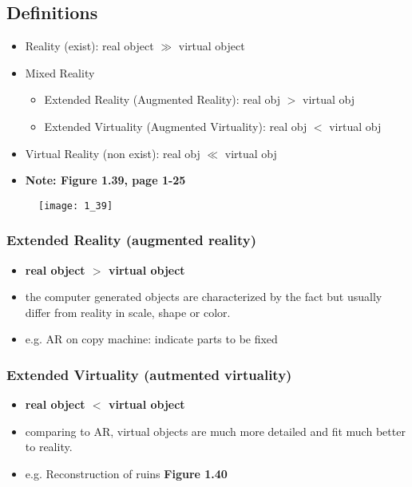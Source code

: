 \documentclass{standalone}
\begin{document}
\subsection{Definitions}

\begin{itemize}
	\item Reality (exist): real object $\gg$ virtual object
	\item Mixed Reality 
		\begin{itemize}
			\item Extended Reality (Augmented Reality): real obj $>$ virtual obj
			\item Extended Virtuality (Augmented Virtuality): real obj $<$ virtual obj
		\end{itemize}
	\item Virtual Reality (non exist): real obj $\ll$ virtual obj
	\item \textbf{Note: Figure 1.39, page 1-25}
\end{itemize}

\begin{figure}[h]
	\texttt{[image: 1\_39]}
\end{figure}

\subsubsection{Extended Reality (augmented reality)}

\begin{itemize}
	\item \textbf{real object $>$ virtual object}
	\item the computer generated objects are characterized by the fact but usually differ from reality in scale, shape or color.
	\item e.g. AR on copy machine: indicate parts to be fixed  
\end{itemize}

\subsubsection{Extended Virtuality (autmented virtuality)}

\begin{itemize}
	\item \textbf{real object $<$ virtual object}
	\item comparing to AR, virtual objects are much more detailed and fit much better to reality.
	\item e.g. Reconstruction of ruins \textbf{Figure 1.40}
\end{itemize}
\end{document}
